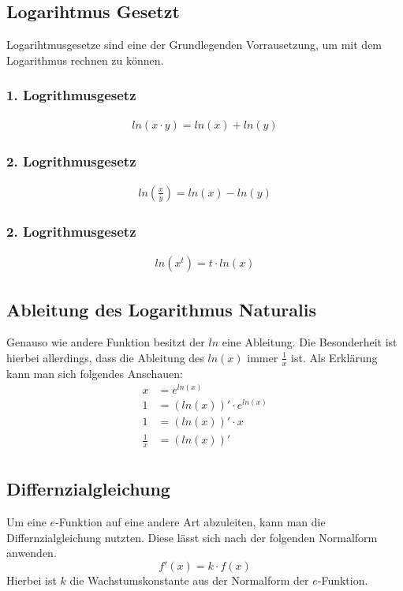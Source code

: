 \subsection{Logarihtmus Gesetzt}
Logarihtmusgesetze sind eine der Grundlegenden Vorrausetzung, um mit dem Logarithmus rechnen zu können. 
\subsubsection{1. Logrithmusgesetz}
\begin{align*}
	ln(x\cdot y)=ln(x)+ln(y)
\end{align*}
\subsubsection{2. Logrithmusgesetz}
\begin{align*}
	ln\left(\frac{x}{y}\right)=ln(x)-ln(y)
\end{align*}
\subsubsection{2. Logrithmusgesetz}
\begin{align*}
	ln(x^t)=t\cdot ln(x)
\end{align*}
\pagebreak
\subsection{Ableitung des Logarithmus Naturalis}
Genauso wie andere Funktion besitzt der $ln$ eine Ableitung. Die Besonderheit ist hierbei allerdings, dass die Ableitung des $ln(x)$ immer $\frac{1}{x}$ ist. Als Erklärung kann man sich folgendes Anschauen:
\begin{align*}
	x&=e^{ln(x)}\tag{Ableiten auf beiden Seiten}\\
	1&=(ln(x))'\cdot e^{ln(x)}\tag{Beide Seiten vereinfachen}\\
	1&=(ln(x))'\cdot x\tag{Durch $x$ dividieren}\\
	\frac{1}{x}&=(ln(x))'\\	
\end{align*}
\subsection{Differnzialgleichung}
Um eine $e$-Funktion auf eine andere Art abzuleiten, kann man die Differnzialgleichung nutzten. Diese lässt sich nach der folgenden Normalform anwenden. 
\[f'(x)=k\cdot f(x)\]
Hierbei ist $k$ die Wachstumskonstante aus der Normalform der $e$-Funktion. 
\pagebreak
